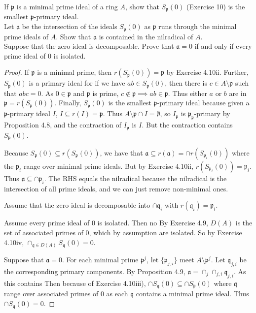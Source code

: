 \begin{exercise}
	If $\mathfrak{p}$ is a minimal prime ideal of a ring $A$, show that $S_\mathfrak{p}(0)$ (Exercise 10) is the smallest $\mathfrak{p}$-primary ideal. \\
	Let $\mathfrak{a}$ be the intersection of the ideals $S_\mathfrak{p}(0)$ as $\mathfrak{p}$ runs through the minimal prime ideals of $A$. Show that $\mathfrak{a}$ is contained in the nilradical of $A$.\\
	Suppose that the zero ideal is decomposable. Prove that $\mathfrak{a} = 0$ if and only if every prime ideal of $0$ is isolated.
\end{exercise}
\begin{proof}
	If $\mathfrak{p} $ is a minimal prime, then $r(S_ \mathfrak{p}(0)) = \mathfrak{p} $ by Exercise 4.10ii.
	Further, $S_{\mathfrak{p}}(0) $ is a primary ideal for if we have $ab \in S_{\mathfrak{p}}(0) $, then there is $c \in A \setminus \mathfrak{p} $ such that $abc = 0 $.
	As $0\in \mathfrak{p} $ and $\mathfrak{p} $ is prime, $c\notin \mathfrak{p} \implies ab \in \mathfrak{p} $.
	Thus either $a $ or $b $ are in $\mathfrak{p} = r(S_{\mathfrak{p}}(0)) $.
	Finally, $S_{\mathfrak{p}}(0) $ is the smallest $\mathfrak{p} $-primary ideal because given a $\mathfrak{p} $-primary ideal $I $, $I \subseteq r(I) = \mathfrak{p} $.
	Thus $A \setminus \mathfrak{p} \cap I = \emptyset $, so $I_{\mathfrak{p}} $ is $\mathfrak{p}_{\mathfrak{p}}$-primary by Proposition 4.8, and the contraction of $I_{\mathfrak{p}} $ is $I $.
	But the contraction contains $S_{\mathfrak{p}}(0) $.

	Because $S_{\mathfrak{p}}(0) \subseteq r(S_{\mathfrak{p}}(0)) $, we have that $\mathfrak{a} \subseteq r(\mathfrak{a}) = \cap r(S_{\mathfrak{p}_i}(0)) $ where the $\mathfrak{p}_i$ range over minimal prime ideals.
	But by Exercise 4.10ii, $r(S_{\mathfrak{p}_i}(0)) = \mathfrak{p}_i $.
	Thus $\mathfrak{a} \subseteq \cap \mathfrak{p}_i $.
	The RHS equals the nilradical because the nilradical is the intersection of all prime ideals, and we can just remove non-minimal ones.

	Assume that the zero ideal is decomposable into $\cap \mathfrak{q}_i$ with $r(\mathfrak{q}_i) = \mathfrak{p}_i $.

	Assume every prime ideal of $0 $ is isolated.
	Then no 
	By Exercise 4.9, $D(A) $ is the set of associated primes of $0 $, which by assumption are isolated.
	So by Exercise 4.10iv, $\cap_{\mathfrak{q}\in D(A)} S_{\mathfrak{q}}(0) = 0 $.

	Suppose that $\mathfrak{a} = 0 $.
	For each minimal prime $\mathfrak{p}^j $, let $\{\mathfrak{p}_{j,i}\}   $ meet $A \setminus \mathfrak{p}^j $.
	Let $\mathfrak{q}_{j,i} $ be the corresponding primary components.
	By Proposition 4.9, $\mathfrak{a} = \cap_{j} \cap_{j,i} \mathfrak{q}_{j,i} $.
	As this contains 
	Then because of Exercise 4.10iii), $\cap S_{\mathfrak{q}}(0) \subseteq \cap S_{\mathfrak{p}}(0) $ where $\mathfrak{q} $ range over associated primes of $0 $ as each $\mathfrak{q} $ contains a minimal prime ideal.
	Thus $\cap S_{\mathfrak{q}}(0) = 0 $.
\end{proof}

